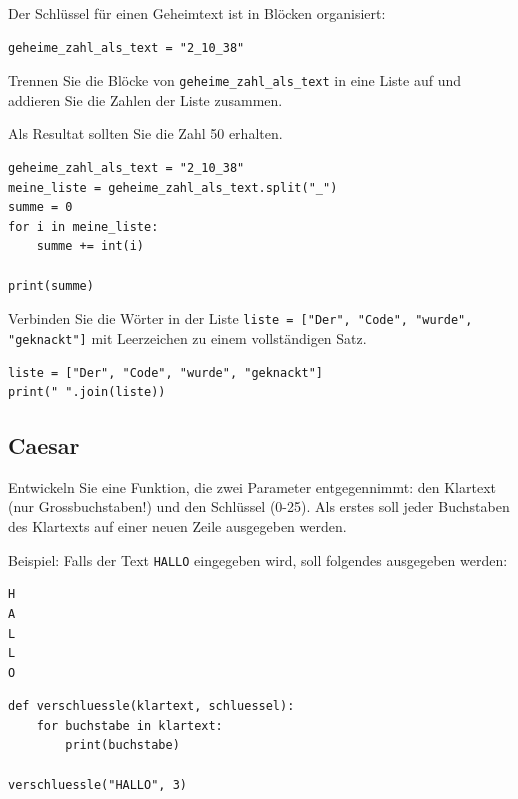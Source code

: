  \begin{mysubmission}
Der Schlüssel für einen Geheimtext ist in Blöcken organisiert:

\begin{lstlisting}
geheime_zahl_als_text = "2_10_38"
\end{lstlisting}

Trennen Sie die Blöcke von \lstinline|geheime_zahl_als_text| in eine Liste auf und addieren Sie die Zahlen der Liste zusammen.

Als Resultat sollten Sie die Zahl 50 erhalten.
\begin{myanswer}
\begin{lstlisting}
geheime_zahl_als_text = "2_10_38"
meine_liste = geheime_zahl_als_text.split("_")
summe = 0
for i in meine_liste:
    summe += int(i)
    
print(summe)
\end{lstlisting}
\end{myanswer}
 \end{mysubmission}
 
 \begin{myexercise}
Verbinden Sie die Wörter in der Liste \lstinline|liste = ["Der", "Code", "wurde", "geknackt"]| mit Leerzeichen zu einem vollständigen Satz.
\begin{myanswer}
\begin{lstlisting}
liste = ["Der", "Code", "wurde", "geknackt"]
print(" ".join(liste))
\end{lstlisting}
\end{myanswer}
 \end{myexercise}

\newpage\subsection{Caesar}
\begin{myexercise}\label{ex:oneline}
Entwickeln Sie eine Funktion, die zwei Parameter entgegennimmt: den Klartext (nur Grossbuchstaben!) und den Schlüssel (0-25). Als erstes soll jeder Buchstaben des Klartexts auf einer neuen Zeile ausgegeben werden. 

Beispiel: Falls der Text \texttt{HALLO} eingegeben wird, soll folgendes ausgegeben werden:
\begin{lstlisting}[language=bash]
H
A
L
L
O
\end{lstlisting}
\begin{myanswer}
\begin{lstlisting}
def verschluessle(klartext, schluessel):
    for buchstabe in klartext:
        print(buchstabe)

verschluessle("HALLO", 3)
\end{lstlisting}
\end{myanswer}
\end{myexercise}

